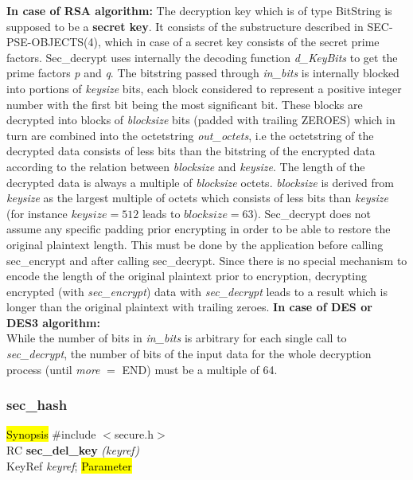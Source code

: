 {\bf In case of RSA algorithm:}
\be
\m The decryption key which is of type BitString is supposed to be
   a {\bf secret key}. It consists of the substructure described in
   SEC-PSE-OBJECTS(4), which in case of a secret key consists of the secret
   prime factors. Sec\_decrypt uses internally the
   decoding function {\em d\_KeyBits} to get the prime factors {\em p} and {\em q}.
\m The bitstring passed through {\em in\_bits} is internally blocked into portions of
   {\em keysize} bits, each block considered to represent a positive integer number with the first bit
   being the most significant bit. These blocks are decrypted into blocks of {\em blocksize} bits
   (padded with trailing ZEROES) which in turn are combined into the octetstring {\em out\_octets}, i.e
   the octetstring of the decrypted data consists of less bits than the bitstring 
   of the encrypted data
   according to the relation between {\em blocksize} and {\em keysize}.
   The length of the decrypted data is always a multiple of {\em blocksize} octets.
   {\em blocksize} is derived from {\em keysize} as the largest multiple of octets which consists of
   less bits than {\em keysize} (for instance $keysize = 512$ leads to $blocksize = 63$).
\m Sec\_decrypt does not assume any specific padding prior encrypting in order to be able to
   restore the original plaintext length. This must be done by the application before 
   calling  sec\_encrypt and after calling sec\_decrypt.
\m Since there is no special mechanism to encode the length of the original plaintext prior
   to encryption, decrypting encrypted (with {\em sec\_encrypt}) data with {\em sec\_decrypt}
   leads to a result which is longer than the original plaintext with trailing zeroes.
\ee
{\bf In case of DES or DES3 algorithm:} \\ [1em]
   While the number of bits in {\em in\_bits} is arbitrary for each single call to
   {\em sec\_decrypt}, the number of bits of the input data for the whole
   decryption process (until {\em more} $=$ END) must be a multiple of 64. 


\subsubsection{sec\_hash}
\label{sec_del_key}
\hl{Synopsis}
\#include $<$secure.h$>$ \\ [0.5cm]
RC {\bf sec\_del\_key} {\em (keyref)} \\
KeyRef {\em keyref};
\hl{Parameter}

